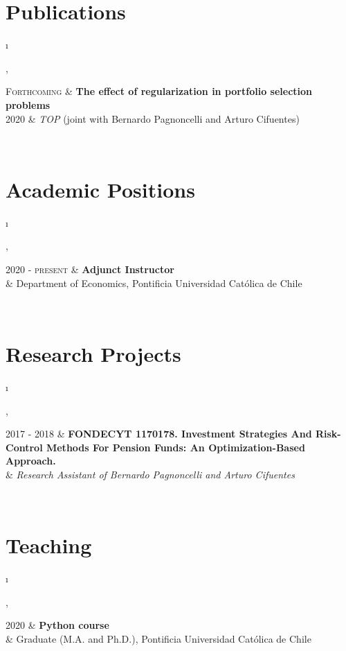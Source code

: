 \documentclass[a4paper, margins=2cm,10pt]{article}
\newcommand{\tablength}{}
\newcommand{\setTabParams}[1]{\renewcommand\tablength{}\forcsvlist{\listadd\tablength}{#1}}
\newcommand{\setCols}[1]{			%
	\ifnum0=\i						%
		\ifdim0cm=#1				%
			\def \firstCol {r}		%
		\else						%
			\def \firstCol {p{#1}}		%
		\fi						%
	\else \ifnum1=\i				%
		\ifdim0cm=#1				%
			\def \secondCol {l}		%
		\else						%
			\def \secondCol{p{#1}}	%
		\fi						%
	\else \ifnum2=\i				%
		\ifnum0=#1				%
			\def \sep {}			%
		\else						%
			\def \sep {|}			%
		\fi						%
	\fi \fi \fi						%
	\advance\i by1					%
}
\newcommand{\tab}[1]{					%
	\newcount\i						%
	\forlistloop{\setCols}{\tablength}		%
	\begin{tabular}{\firstCol \sep \secondCol}	%
		#1							%
	\end{tabular} \\						%
}
\begin{document}
\section{Publications}
\setTabParams{0cm,11cm,1}

\tab{
\textsc{Forthcoming}	&	\textbf{The effect of regularization in portfolio selection problems} \\[0.2ex]
\textsc{2020}		&	\textit{TOP} (joint with Bernardo Pagnoncelli and Arturo Cifuentes)
}

\section{Academic Positions}
\setTabParams{0cm,11cm,1}

\tab{
\textsc{2020 - present}
 	&	\textbf{Adjunct Instructor}	\\[0.2ex]
	&	Department of Economics, Pontificia Universidad Católica de Chile
}

\section{Research Projects}
\setTabParams{0cm,11cm,1}

\tab{
\textsc{2017 - 2018}
 	&	\textbf{FONDECYT 1170178. Investment Strategies And Risk-Control Methods For Pension Funds: An Optimization-Based Approach.} \\[0.2ex]
	&	\emph{Research Assistant of Bernardo Pagnoncelli and Arturo Cifuentes}
}
%

\section{Teaching}
\setTabParams{0cm,11cm,1}

\tab{
\textsc{2020} 
	&	\textbf{Python course}	\\[0.2ex]
	&	Graduate (M.A. and Ph.D.), Pontificia Universidad Católica de Chile
}
\end{document}
